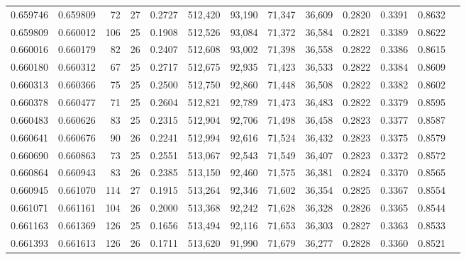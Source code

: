 \begin{tabular}{rrrrrrrrrrrrr}
0.659746 & 0.659809 &    72 &  27 &                                     0.2727 & 512,420 &  93,190 &  71,347 &  36,609 & 0.2820 & 0.3391 & 0.8632 \\
0.659809 & 0.660012 &   106 &  25 &                                     0.1908 & 512,526 &  93,084 &  71,372 &  36,584 & 0.2821 & 0.3389 & 0.8622 \\
0.660016 & 0.660179 &    82 &  26 &                                     0.2407 & 512,608 &  93,002 &  71,398 &  36,558 & 0.2822 & 0.3386 & 0.8615 \\
0.660180 & 0.660312 &    67 &  25 &                                     0.2717 & 512,675 &  92,935 &  71,423 &  36,533 & 0.2822 & 0.3384 & 0.8609 \\
0.660313 & 0.660366 &    75 &  25 &                                     0.2500 & 512,750 &  92,860 &  71,448 &  36,508 & 0.2822 & 0.3382 & 0.8602 \\
0.660378 & 0.660477 &    71 &  25 &                                     0.2604 & 512,821 &  92,789 &  71,473 &  36,483 & 0.2822 & 0.3379 & 0.8595 \\
0.660483 & 0.660626 &    83 &  25 &                                     0.2315 & 512,904 &  92,706 &  71,498 &  36,458 & 0.2823 & 0.3377 & 0.8587 \\
0.660641 & 0.660676 &    90 &  26 &                                     0.2241 & 512,994 &  92,616 &  71,524 &  36,432 & 0.2823 & 0.3375 & 0.8579 \\
0.660690 & 0.660863 &    73 &  25 &                                     0.2551 & 513,067 &  92,543 &  71,549 &  36,407 & 0.2823 & 0.3372 & 0.8572 \\
0.660864 & 0.660943 &    83 &  26 &                                     0.2385 & 513,150 &  92,460 &  71,575 &  36,381 & 0.2824 & 0.3370 & 0.8565 \\
0.660945 & 0.661070 &   114 &  27 &                                     0.1915 & 513,264 &  92,346 &  71,602 &  36,354 & 0.2825 & 0.3367 & 0.8554 \\
0.661071 & 0.661161 &   104 &  26 &                                     0.2000 & 513,368 &  92,242 &  71,628 &  36,328 & 0.2826 & 0.3365 & 0.8544 \\
0.661163 & 0.661369 &   126 &  25 &                                     0.1656 & 513,494 &  92,116 &  71,653 &  36,303 & 0.2827 & 0.3363 & 0.8533 \\
0.661393 & 0.661613 &   126 &  26 &                                     0.1711 & 513,620 &  91,990 &  71,679 &  36,277 & 0.2828 & 0.3360 & 0.8521 \\

\end{tabular}
